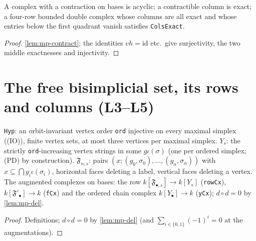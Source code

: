 \begin{lemma}\label{lem:mp-bcx-contr}
  \leanok
  A complex with a contraction on bases is acyclic; a contractible column is exact; a four-row bounded double complex whose
  columns are all exact and whose entries below the first quadrant vanish satisfies \texttt{ColsExact}.
\end{lemma}
\begin{proof}
  \leanok
  \ref{lem:mp-contract}; the identities $vh=\mathrm{id}$ etc.\ give surjectivity, the two middle exactnesses and injectivity.
\end{proof}

\section{The free bisimplicial set, its rows and columns (L3--L5)}

\begin{definition}\label{def:mp-bisimp}
  \leanok
  \texttt{Hyp}: an orbit-invariant vertex order \texttt{ord} injective on every maximal simplex ((IO)), finite vertex sets, at most
  three vertices per maximal simplex.  $Y_s$: the strictly \texttt{ord}-increasing vertex strings in some $g\iota(\sigma)$ (one per
  ordered simplex; (PD) by construction).  $\mathfrak F_{n,s}$: pairs $(x;(g_0,\sigma_0),\dots,(g_n,\sigma_n))$ with
  $x\subseteq\bigcap g_i\iota(\sigma_i)$, horizontal faces deleting a label, vertical faces deleting a vertex.  The augmented
  complexes on bases: the row $k[\mathfrak F_{\bullet,s}]\to k[Y_s]$ (\texttt{rowCx}), $k[\mathfrak F'_\bullet]\to k$
  (\texttt{fCx}) and the ordered chain complex $k[Y_\bullet]\to k$ (\texttt{yCx}); $d\circ d=0$ by \ref{lem:mp-del}.
\end{definition}
\begin{proof}
  \leanok
  Definitions; $d\circ d=0$ by \ref{lem:mp-del} (and $\sum_{i\in\{0,1\}}(-1)^i=0$ at the augmentations).
\end{proof}


